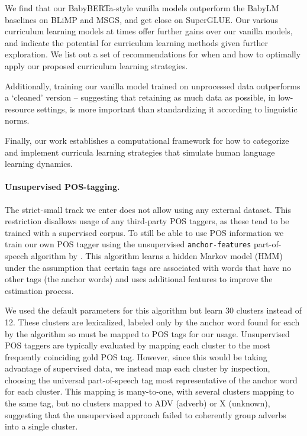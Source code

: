 We find that our BabyBERTa-style vanilla models outperform the BabyLM baselines on BLiMP and MSGS, and get close on SuperGLUE. Our various curriculum learning models at times offer further gains over our vanilla models, and indicate the potential for curriculum learning methods given further exploration. We list out a set of recommendations for when and how to optimally apply our proposed curriculum learning strategies.

Additionally, training our vanilla model trained on unprocessed data outperforms a `cleaned' version -- suggesting that retaining as much data as possible, in low-resource settings, is more important than standardizing it according to linguistic norms.

Finally, our work establishes a computational framework for how to categorize and implement curricula learning strategies that simulate human language learning dynamics. 


\paragraph{Unsupervised POS-tagging.}
The strict-small track we enter does not allow using any external dataset. This restriction disallows usage of any third-party POS taggers, as these tend to be trained with a supervised corpus. To still be able to use POS information we train our own POS tagger using the unsupervised \texttt{anchor-features} part-of-speech algorithm by \citet{stratos2016unsupervisedpos}. This algorithm learns a hidden Markov model (HMM) under the assumption that certain tags are associated with words that have no other tags (the anchor words) and uses additional features to improve the estimation process.

We used the default parameters for this algorithm but learn 30 clusters instead of 12. These clusters are lexicalized, labeled only by the anchor word found for each by the algorithm so must be mapped to POS tags for our usage. Unsupervised POS taggers are typically evaluated by mapping each cluster to the most frequently coinciding gold POS tag. However, since this would be taking advantage of supervised data, we instead map each cluster by inspection, choosing the universal part-of-speech tag \citep{petrov2012universalpos} most representative of the anchor word for each cluster. This mapping is many-to-one, with several clusters mapping to the same tag, but no clusters mapped to ADV (adverb) or X (unknown), suggesting that the unsupervised approach failed to coherently group adverbs into a single cluster.

